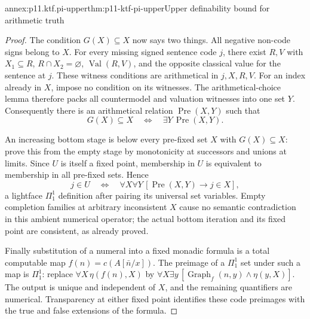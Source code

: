 \begin{annexitem}{annex:p11.ktf.pi-upper}{thm:p11-ktf-pi-upper}{Upper definability bound for arithmetic truth}
\begin{proof}
The condition \(G(X)\subseteq X\) now says two things. All negative
non-code signs belong to \(X\). For every missing signed sentence
code \(j\), there exist \(R,V\) with
\(X_1\subseteq R\), \(R\cap X_2=\varnothing\),
\(\operatorname{Val}(R,V)\), and the opposite classical value
for the sentence at \(j\). These witness conditions are arithmetical
in \(j,X,R,V\). For an index already in \(X\), impose no
condition on its witnesses. The arithmetical-choice lemma therefore
packs all countermodel and valuation witnesses into one set \(Y\).
Consequently there is an arithmetical relation \(\operatorname{Pre}(X,Y)\)
such that
\[
 G(X)\subseteq X\quad\Longleftrightarrow\quad
 \exists Y\,\operatorname{Pre}(X,Y).
\]

An increasing bottom stage is below every pre-fixed set \(X\) with
\(G(X)\subseteq X\): prove this from the empty stage by monotonicity
at successors and unions at limits. Since \(U\) is itself a fixed
point, membership in \(U\) is equivalent to membership in all
pre-fixed sets. Hence
\[
 j\in U\quad\Longleftrightarrow\quad
 \forall X\forall Y\,[\operatorname{Pre}(X,Y)\to j\in X],
\]
a lightface \(\Pi^1_1\) definition after pairing its universal
set variables. Empty completion families at arbitrary inconsistent
\(X\) cause no semantic contradiction in this ambient numerical
operator; the actual bottom iteration and its fixed point are consistent,
as already proved.

Finally substitution of a numeral into a fixed monadic formula is a
total computable map \(f(n)=c(A[\bar n/x])\). The preimage of a
\(\Pi^1_1\) set under such a map is \(\Pi^1_1\): replace
\(\forall X\,\eta(f(n),X)\) by
\(\forall X\exists y\,[\operatorname{Graph}_f(n,y)\land\eta(y,X)]\).
The output is unique and independent of \(X\), and the remaining
quantifiers are numerical. Transparency at either fixed point identifies
these code preimages with the true and false extensions of the formula.
\end{proof}
\end{annexitem}

